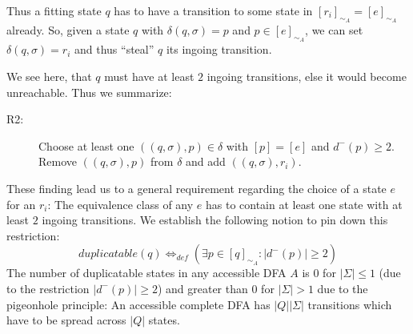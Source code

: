 Thus a fitting state $q$ has to have a transition to some state in $[r_i]_{\sim_A} = [e]_{\sim_A}$ already. So, given a state $q$ with $\delta(q, \sigma) = p$ and $p \in [e]_{\sim_A}$, we can set $\delta(q, \sigma) = r_i$ and thus ``steal'' $q$ its ingoing transition.

We see here, that $q$ must have at least $2$ ingoing transitions, else it would become unreachable. Thus we summarize:
\begin{description}
	\item[R2:] Choose at least one $((q, \sigma), p) \in \delta$ with $[p] = [e]$ and $d^-(p) \geq 2$. Remove $((q, \sigma), p)$ from $\delta$ and add $((q, \sigma), r_i)$.
\end{description}
These finding lead us to a general requirement regarding the choice of a state $e$ for an $r_i$: The equivalence class of any $e$ has to contain at least one state with at least $2$ ingoing transitions. We establish the following notion to pin down this restriction:
\[
	duplicatable(q) \Leftrightarrow_{def} (\exists p \in [q]_{\sim_A}\colon |d^-(p)| \geq 2)
\]
The number of duplicatable states in any accessible DFA $A$ is $0$ for $|\Sigma| \leq 1$ (due to the restriction $|d^-(p)| \geq 2$) and greater than $0$ for $|\Sigma| > 1$ due to the pigeonhole principle: An accessible complete DFA has $|Q||\Sigma|$ transitions which have to be spread across $|Q|$ states.
%	
%	
%	
%	
%	

